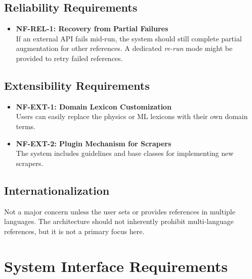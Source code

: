 \documentclass[12pt]{article}
\begin{document}
\subsection{Reliability Requirements}
\begin{itemize}
  \item \textbf{NF-REL-1: Recovery from Partial Failures} \\
  If an external API fails mid-run, the system should still complete partial augmentation for other references. A dedicated \emph{re-run} mode might be provided to retry failed references.
\end{itemize}

\subsection{Extensibility Requirements}
\begin{itemize}
  \item \textbf{NF-EXT-1: Domain Lexicon Customization} \\
  Users can easily replace the physics or ML lexicons with their own domain terms. 
  \item \textbf{NF-EXT-2: Plugin Mechanism for Scrapers} \\
  The system includes guidelines and base classes for implementing new scrapers. 
\end{itemize}

\subsection{Internationalization}
Not a major concern unless the user sets or provides references in multiple languages. The architecture should not inherently prohibit multi-language references, but it is not a primary focus here.

\newpage

\section{System Interface Requirements}
\end{document}

